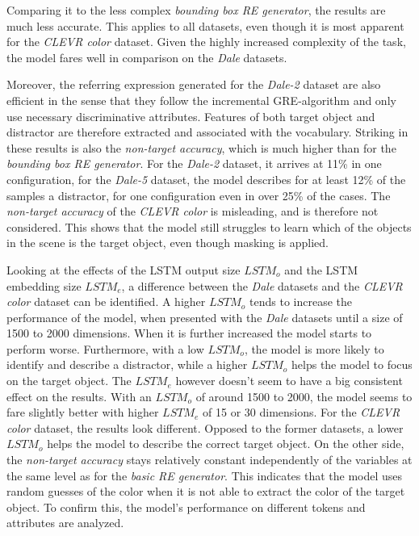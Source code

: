 Comparing it to the less complex \emph{bounding box RE generator}, the results are much less accurate.
This applies to all datasets, even though it is most apparent for the \emph{CLEVR color} dataset.
Given the highly increased complexity of the task, the model fares well in comparison on the \emph{Dale} datasets.

Moreover, the referring expression generated for the \emph{Dale-2} dataset are also efficient in the sense that they follow the incremental GRE-algorithm and only use necessary discriminative attributes.
Features of both target object and distractor are therefore extracted and associated with the vocabulary.
Striking in these results is also the \emph{non-target accuracy}, which is much higher than for the \emph{bounding box RE generator}.
For the \emph{Dale-2} dataset, it arrives at 11\% in one configuration, for the \emph{Dale-5} dataset, the model describes for at least 12\% of the samples a distractor, for one configuration even in over 25\% of the cases.
The \emph{non-target accuracy} of the \emph{CLEVR color} is misleading, and is therefore not considered.
This shows that the model still struggles to learn which of the objects in the scene is the target object, even though masking is applied.

Looking at the effects of the LSTM output size $LSTM_o$ and the LSTM embedding size $LSTM_e$, a difference between the \emph{Dale} datasets and the \emph{CLEVR color} dataset can be identified.
A higher $LSTM_o$ tends to increase the performance of the model, when presented with the \emph{Dale} datasets until a size of 1500 to 2000 dimensions.
When it is further increased the model starts to perform worse.
Furthermore, with a low $LSTM_o$, the model is more likely to identify and describe a distractor, while a higher $LSTM_o$ helps the model to focus on the target object.
The $LSTM_e$ however doesn't seem to have a big consistent effect on the results. With an $LSTM_o$ of around 1500 to 2000, the model seems to fare slightly better with higher $LSTM_e$ of 15 or 30 dimensions.
For the \emph{CLEVR color} dataset, the results look different.
Opposed to the former datasets, a lower $LSTM_o$ helps the model to describe the correct target object.
On the other side, the \emph{non-target accuracy} stays relatively constant independently of the variables at the same level as for the \emph{basic RE generator}.
This indicates that the model uses random guesses of the color when it is not able to extract the color of the target object.
To confirm this, the model's performance on different tokens and attributes are analyzed.

